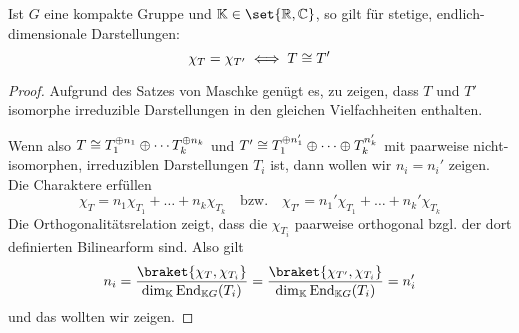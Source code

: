 \begin{corollary}
Ist $G$ eine kompakte Gruppe und $\IK\in\set{\IR,\IC}$, so gilt für stetige, endlich-dimensionale Darstellungen:
\[\chi_T = \chi_{T'} \iff T \cong T'\]
\end{corollary}
\begin{proof}
Aufgrund des Satzes von Maschke genügt es, zu zeigen, dass $T$ und $T'$ isomorphe irreduzible Darstellungen in den gleichen Vielfachheiten enthalten.

Wenn also $T \cong T_1 ^{\oplus n_1} \oplus \cdots T_k^{\oplus n_k}$ und $T' \cong T_1^{\oplus n_1'} \oplus \cdots \oplus T_k^{n_k'}$ mit paarweise nicht-isomorphen, irreduziblen Darstellungen $T_i$ ist, dann wollen wir $n_i=n_i'$ zeigen. Die Charaktere erfüllen
\[\chi_T = n_1 \chi_{T_1} + \ldots + n_k\chi_{T_k} \quad\text{bzw.}\quad \chi_{T'} = n_1' \chi_{T_1} + \ldots + n_k' \chi_{T_k}\] 
Die Orthogonalitätsrelation zeigt, dass die $\chi_{T_i}$ paarweise orthogonal bzgl. der dort definierten Bilinearform sind. Also gilt
\[n_i = \frac{\braket{\chi_T, \chi_{T_i}}}{\dim_\IK \End_{\IK G}(T_i)} = \frac{\braket{\chi_{T'}, \chi_{T_i}}}{\dim_\IK \End_{\IK G}(T_i)} = n_i'\]
und das wollten wir zeigen.
\end{proof}